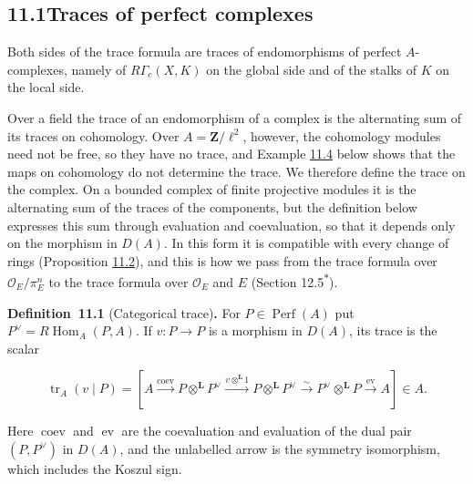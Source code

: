 \documentclass[11pt]{article}
\newenvironment{bpstatement}[2]{\par\addvspace{0.6\baselineskip}\noindent\textbf{#1}#2\textbf{.}\enspace\ignorespaces}
  {\par\addvspace{0.4\baselineskip}}
\newcommand{\bpout}[1]{#1\textsuperscript{\hyperlink{bp-outside}{\ensuremath{\ast}}}}
\begin{document}
\subsection*{\texorpdfstring{11.1\quad Traces of perfect complexes}{11.1 Traces of perfect complexes}}
\label{bp3}%
\label{bp4}%
Both sides of the trace formula are traces of endomorphisms of perfect \(A\)-complexes, namely of \(R\Gamma_c(X,K)\) on the global side and of the stalks of \(K\) on the local side.

Over a field the trace of an endomorphism of a complex is the alternating sum of its traces on cohomology. Over \(A=\mathbf Z/\ell^2\), however, the cohomology modules need not be free, so they have no trace, and Example \hyperref[bp12]{11.4} below shows that the maps on cohomology do not determine the trace. We therefore define the trace on the complex. On a bounded complex of finite projective modules it is the alternating sum of the traces of the components, but the definition below expresses this sum through evaluation and coevaluation, so that it depends only on the morphism in \(D(A)\). In this form it is compatible with every change of rings (Proposition \hyperref[bp7]{11.2}), and this is how we pass from the trace formula over \(\mathcal O_E/\pi_E^n\) to the trace formula over \(\mathcal O_E\) and \(E\) (Section \bpout{12.5}).

\label{bp5}%
\begin{bpstatement}{Definition~11.1}{ (Categorical trace)}
For \(P\in\operatorname{Perf}(A)\) put \(P^\vee=R\!\operatorname{Hom}_A(P,A)\). If \(v:P\to P\) is a morphism in \(D(A)\), its trace is the scalar

\[
\operatorname{tr}_A(v\mid P)=
\left[A\xrightarrow{\operatorname{coev}}P\otimes^{\mathbf L} P^\vee
\xrightarrow{v\otimes^{\mathbf L}1}P\otimes^{\mathbf L} P^\vee
\xrightarrow{\sim}P^\vee\otimes^{\mathbf L} P
\xrightarrow{\operatorname{ev}}A\right]\in A.
\]

Here \(\operatorname{coev}\) and \(\operatorname{ev}\) are the coevaluation and evaluation of the dual pair \((P,P^\vee)\) in \(D(A)\), and the unlabelled arrow is the symmetry isomorphism, which includes the Koszul sign.
\end{bpstatement}
\end{document}
